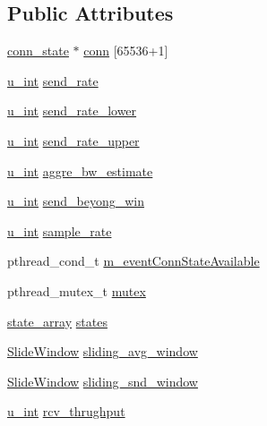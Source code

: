 \subsection*{\-Public \-Attributes}
\begin{DoxyCompactItemize}
\item 
\hyperlink{structconn__state}{conn\-\_\-state} $\ast$ \hyperlink{structTCB_a1bd7c7b11c941c48cdb79aa785abaa1d}{conn} \mbox{[}65536+1\mbox{]}
\item 
\hyperlink{split__tcp__gateway_8h_ac319c165d52643e43249fe003e18bdf3}{u\-\_\-int} \hyperlink{structTCB_abbd5613201064f5d9d4d7436e6c19959}{send\-\_\-rate}
\item 
\hyperlink{split__tcp__gateway_8h_ac319c165d52643e43249fe003e18bdf3}{u\-\_\-int} \hyperlink{structTCB_af8455f4826761c7db060a0ce982474f8}{send\-\_\-rate\-\_\-lower}
\item 
\hyperlink{split__tcp__gateway_8h_ac319c165d52643e43249fe003e18bdf3}{u\-\_\-int} \hyperlink{structTCB_ab41abe4a6f0dfbd9957eb1b96167b8cc}{send\-\_\-rate\-\_\-upper}
\item 
\hyperlink{split__tcp__gateway_8h_ac319c165d52643e43249fe003e18bdf3}{u\-\_\-int} \hyperlink{structTCB_ab4f1301b04ebb91f5987fb1b386eef35}{aggre\-\_\-bw\-\_\-estimate}
\item 
\hyperlink{split__tcp__gateway_8h_ac319c165d52643e43249fe003e18bdf3}{u\-\_\-int} \hyperlink{structTCB_a37f319f72768c2ef35d91ceb1869639c}{send\-\_\-beyong\-\_\-win}
\item 
\hyperlink{split__tcp__gateway_8h_ac319c165d52643e43249fe003e18bdf3}{u\-\_\-int} \hyperlink{structTCB_abb4a461b247d257260d72cfa4d03b97a}{sample\-\_\-rate}
\item 
pthread\-\_\-cond\-\_\-t \hyperlink{structTCB_ab95b1587e780086fb1f930e13c79ced7}{m\-\_\-event\-Conn\-State\-Available}
\item 
pthread\-\_\-mutex\-\_\-t \hyperlink{structTCB_a011d3dba417bd02ba236a0955c3ff7d8}{mutex}
\item 
\hyperlink{structstate__array}{state\-\_\-array} \hyperlink{structTCB_ad1aaeb7bb5c5b2fa3f25c5f229cc00ba}{states}
\item 
\hyperlink{structSlideWindow}{\-Slide\-Window} \hyperlink{structTCB_a4a55a613a40f454b855b26aac840929d}{sliding\-\_\-avg\-\_\-window}
\item 
\hyperlink{structSlideWindow}{\-Slide\-Window} \hyperlink{structTCB_a0bf7a4cb540d916181955e0f0b01f800}{sliding\-\_\-snd\-\_\-window}
\item 
\hyperlink{split__tcp__gateway_8h_ac319c165d52643e43249fe003e18bdf3}{u\-\_\-int} \hyperlink{structTCB_a0be41c7cd6d1d7763d59c8ee34c6d79e}{rcv\-\_\-thrughput}

\end{DoxyCompactItemize}
